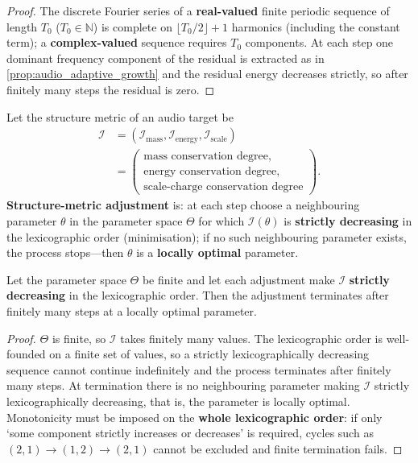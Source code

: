 \begin{proof}
The discrete Fourier series of a \textbf{real-valued} finite periodic sequence of length $T_0$ ($T_0\in\mathbb N$) is complete on $\lfloor T_0/2\rfloor+1$ harmonics (including the constant term); a \textbf{complex-valued} sequence requires $T_0$ components. At each step one dominant frequency component of the residual is extracted as in \cref{prop:audio_adaptive_growth} and the residual energy decreases strictly, so after finitely many steps the residual is zero.
\end{proof}

\begin{definition}\label{def:audio_structure_metric_adjustment}
Let the structure metric of an audio target be
\[
\begin{aligned}
\mathcal I
&=(\mathcal I_{\text{mass}},\mathcal I_{\text{energy}},\mathcal I_{\text{scale}})\\
&=\left(\begin{array}{l}
\text{mass conservation degree},\\
\text{energy conservation degree},\\
\text{scale-charge conservation degree}
\end{array}\right).
\end{aligned}
\]
\textbf{Structure-metric adjustment} is: at each step choose a neighbouring parameter $\theta$ in the parameter space $\Theta$ for which $\mathcal I(\theta)$ is \textbf{strictly decreasing} in the lexicographic order (minimisation); if no such neighbouring parameter exists, the process stops---then $\theta$ is a \textbf{locally optimal} parameter.
\end{definition}

\begin{proposition}\label{prop:audio_structure_metric_convergence}
Let the parameter space $\Theta$ be finite and let each adjustment make $\mathcal I$ \textbf{strictly decreasing} in the lexicographic order. Then the adjustment terminates after finitely many steps at a locally optimal parameter.
\end{proposition}

\begin{proof}
$\Theta$ is finite, so $\mathcal I$ takes finitely many values. The lexicographic order is well-founded on a finite set of values, so a strictly lexicographically decreasing sequence cannot continue indefinitely and the process terminates after finitely many steps. At termination there is no neighbouring parameter making $\mathcal I$ strictly lexicographically decreasing, that is, the parameter is locally optimal. Monotonicity must be imposed on the \textbf{whole lexicographic order}: if only `some component strictly increases or decreases' is required, cycles such as $(2,1)\to(1,2)\to(2,1)$ cannot be excluded and finite termination fails.
\end{proof}

